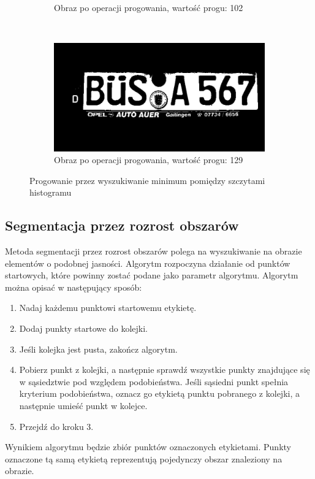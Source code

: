 \begin{figure}
\begin{subfigure}[b]{0.45\textwidth}
    \caption{Obraz po operacji progowania, wartość progu: 102}
    \label{fig:histogram_valleys_bad}
  \end{subfigure}
  ~
  \begin{subfigure}[b]{0.45\textwidth}
    \includegraphics[width=\textwidth]{img/histogram-valleys-good}
    \caption{Obraz po operacji progowania, wartość progu: 129}
    \label{fig:hitogram_valleys_good}
  \end{subfigure}
  \caption{Progowanie przez wyszukiwanie minimum pomiędzy szczytami histogramu}\label{fig:histogram_valleys}
\end{figure}
\subsection{Segmentacja przez rozrost obszarów}
Metoda segmentacji przez rozrost obszarów polega na wyszukiwanie na obrazie elementów o podobnej jasności. Algorytm rozpoczyna działanie od punktów startowych, które powinny zostać podane jako parametr algorytmu. Algorytm można opisać w następujący sposób:
\begin{enumerate}
  \item Nadaj każdemu punktowi startowemu etykietę.
  \item Dodaj punkty startowe do kolejki.
  \item Jeśli kolejka jest pusta, zakończ algorytm.
  \item Pobierz punkt z kolejki, a następnie sprawdź wszystkie punkty znajdujące się w sąsiedztwie pod względem podobieństwa. Jeśli sąsiedni punkt spełnia kryterium podobieństwa, oznacz go etykietą punktu pobranego z kolejki, a następnie umieść punkt w kolejce.
  \item Przejdź do kroku 3.
\end{enumerate}
Wynikiem algorytmu będzie zbiór punktów oznaczonych etykietami. Punkty oznaczone tą samą etykietą reprezentują pojedynczy obszar znaleziony na obrazie.

